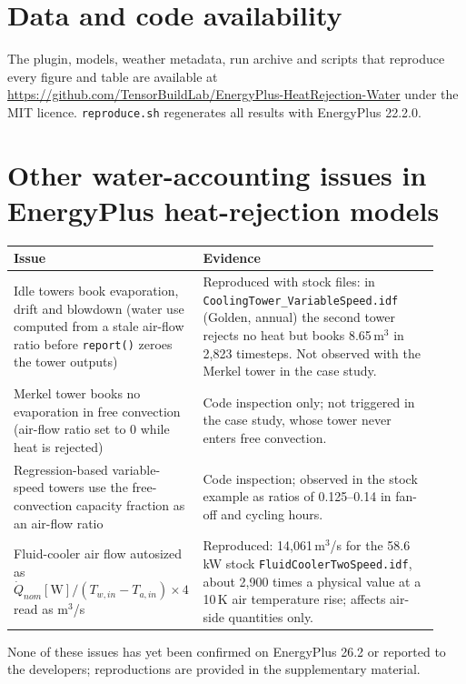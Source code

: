 \documentclass[preprint,12pt,authoryear]{elsarticle}
\begin{document}
\section*{Data and code availability}
The plugin, models, weather metadata, run archive and scripts that reproduce every figure and table are available at
\url{https://github.com/TensorBuildLab/EnergyPlus-HeatRejection-Water} under the MIT licence. \texttt{reproduce.sh} regenerates all results with EnergyPlus 22.2.0.

\appendix
\section{Other water-accounting issues in EnergyPlus heat-rejection models}\label{app:issues}
\begin{table}[h]\centering\scriptsize
\begin{tabular}{p{0.38\linewidth}p{0.55\linewidth}}\toprule
Issue & Evidence \\\midrule
Idle towers book evaporation, drift and blowdown (water use computed from a stale air-flow ratio before \texttt{report()} zeroes
the tower outputs) & Reproduced with stock files: in \texttt{CoolingTower\_VariableSpeed.idf} (Golden, annual) the second tower
rejects no heat but books 8.65\,m$^3$ in 2,823 timesteps. Not observed with the Merkel tower in the case study. \\
Merkel tower books no evaporation in free convection (air-flow ratio set to 0 while heat is rejected) & Code inspection only;
not triggered in the case study, whose tower never enters free convection. \\
Regression-based variable-speed towers use the free-convection capacity fraction as an air-flow ratio & Code inspection;
observed in the stock example as ratios of 0.125--0.14 in fan-off and cycling hours. \\
Fluid-cooler air flow autosized as $\dot Q_{nom}[\mathrm W]/(T_{w,in}-T_{a,in})\times4$ read as m$^3$/s & Reproduced:
14,061\,m$^3$/s for the 58.6\,kW stock \texttt{FluidCoolerTwoSpeed.idf}, about 2,900 times a physical value at a 10\,K air
temperature rise; affects air-side quantities only. \\\bottomrule
\end{tabular}
\end{table}
None of these issues has yet been confirmed on EnergyPlus 26.2 or reported to the developers; reproductions are provided
in the supplementary material.



\end{document}
